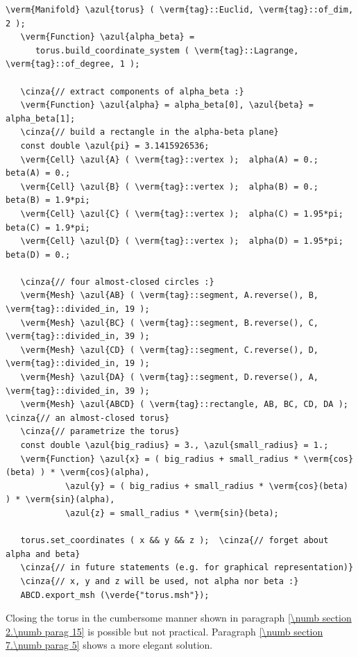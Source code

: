 \begin{Verbatim}[commandchars=\\\{\},formatcom=\small\tt,frame=single,
   label=parag-\ref{\numb section 2.\numb parag 16}.cpp,rulecolor=\color{coment},
   baselinestretch=0.94,framesep=2mm]
   \verm{Manifold} \azul{torus} ( \verm{tag}::Euclid, \verm{tag}::of_dim, 2 );
   \verm{Function} \azul{alpha_beta} =
      torus.build_coordinate_system ( \verm{tag}::Lagrange, \verm{tag}::of_degree, 1 );

   \cinza{// extract components of alpha_beta :}
   \verm{Function} \azul{alpha} = alpha_beta[0], \azul{beta} = alpha_beta[1];
   \cinza{// build a rectangle in the alpha-beta plane}
   const double \azul{pi} = 3.1415926536;
   \verm{Cell} \azul{A} ( \verm{tag}::vertex );  alpha(A) = 0.;       beta(A) = 0.;
   \verm{Cell} \azul{B} ( \verm{tag}::vertex );  alpha(B) = 0.;       beta(B) = 1.9*pi;
   \verm{Cell} \azul{C} ( \verm{tag}::vertex );  alpha(C) = 1.95*pi;  beta(C) = 1.9*pi;
   \verm{Cell} \azul{D} ( \verm{tag}::vertex );  alpha(D) = 1.95*pi;  beta(D) = 0.;

   \cinza{// four almost-closed circles :}
   \verm{Mesh} \azul{AB} ( \verm{tag}::segment, A.reverse(), B, \verm{tag}::divided_in, 19 );
   \verm{Mesh} \azul{BC} ( \verm{tag}::segment, B.reverse(), C, \verm{tag}::divided_in, 39 );
   \verm{Mesh} \azul{CD} ( \verm{tag}::segment, C.reverse(), D, \verm{tag}::divided_in, 19 );
   \verm{Mesh} \azul{DA} ( \verm{tag}::segment, D.reverse(), A, \verm{tag}::divided_in, 39 );
   \verm{Mesh} \azul{ABCD} ( \verm{tag}::rectangle, AB, BC, CD, DA );  \cinza{// an almost-closed torus}
   \cinza{// parametrize the torus}
   const double \azul{big_radius} = 3., \azul{small_radius} = 1.;
   \verm{Function} \azul{x} = ( big_radius + small_radius * \verm{cos}(beta) ) * \verm{cos}(alpha),
            \azul{y} = ( big_radius + small_radius * \verm{cos}(beta) ) * \verm{sin}(alpha),
            \azul{z} = small_radius * \verm{sin}(beta);

   torus.set_coordinates ( x && y && z );  \cinza{// forget about alpha and beta}
   \cinza{// in future statements (e.g. for graphical representation)}
   \cinza{// x, y and z will be used, not alpha nor beta :}
   ABCD.export_msh (\verde{"torus.msh"});
\end{Verbatim}

Closing the torus in the cumbersome manner shown in paragraph
\ref{\numb section 2.\numb parag 15} is possible but not practical.
Paragraph \ref{\numb section 7.\numb parag 5} shows a more elegant solution.

